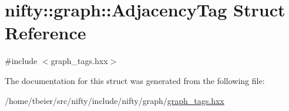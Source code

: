\hypertarget{structnifty_1_1graph_1_1AdjacencyTag}{}\section{nifty\+:\+:graph\+:\+:Adjacency\+Tag Struct Reference}
\label{structnifty_1_1graph_1_1AdjacencyTag}


{\ttfamily \#include $<$graph\+\_\+tags.\+hxx$>$}



The documentation for this struct was generated from the following file\+:\begin{DoxyCompactItemize}
\item 
/home/tbeier/src/nifty/include/nifty/graph/\hyperlink{graph__tags_8hxx}{graph\+\_\+tags.\+hxx}\end{DoxyCompactItemize}
